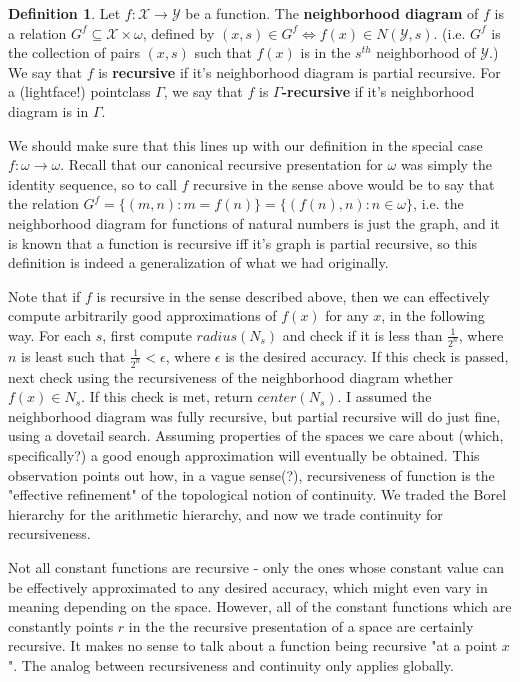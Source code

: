 \documentclass{article}
\theoremstyle{definition}
\newtheorem{definition}{Definition}[section]
\theoremstyle{plain}
\begin{document}
\begin{definition}
    Let $f:\mathcal{X} \to \mathcal{Y}$ be a function. The \textbf{neighborhood diagram} of $f$ is a relation $G^f \subseteq \mathcal{X} \times \omega$, defined by $(x,s) \in G^f \iff f(x) \in N(\mathcal{Y},s)$. (i.e. $G^f$ is the collection of pairs $(x,s)$ such that $f(x)$ is in the $s^{th}$ neighborhood of $\mathcal{Y}$.)
    We say that $f$ is \textbf{recursive} if it's neighborhood diagram is partial recursive. For a (lightface!) pointclass $\Gamma$, we say that $f$ is \textbf{$\Gamma$-recursive} if it's neighborhood diagram is in $\Gamma$. 
\end{definition}
We should make sure that this lines up with our definition in the special case $f:\omega \to \omega$. Recall that our canonical recursive presentation for $\omega$ was simply the identity sequence, so to call $f$ recursive in the sense above would be to say that the relation $G^f = \{(m,n): m = f(n)\} = \{(f(n),n): n \in \omega\}$, i.e. the neighborhood diagram for functions of natural numbers is just the graph, and it is known that a function is recursive iff it's graph is partial recursive, so this definition is indeed a generalization of what we had originally. 
\par Note that if $f$ is recursive in the sense described above, then we can effectively compute arbitrarily good approximations of $f(x)$ for any $x$, in the following way. For each $s$, first compute $radius(N_s)$ and check if it is less than $\frac{1}{2^n}$, where $n$ is least such that $\frac{1}{2^n} < \epsilon$, where $\epsilon$ is the desired accuracy. If this check is passed, next check using the recursiveness of the neighborhood diagram whether $f(x) \in N_s$. If this check is met, return $center(N_s)$. I assumed the neighborhood diagram was fully recursive, but partial recursive will do just fine, using a dovetail search. Assuming properties of the spaces we care about (which, specifically?) a good enough approximation will eventually be obtained. This observation points out how, in a vague sense(?), recursiveness of function is the "effective refinement" of the topological notion of continuity. We traded the Borel hierarchy for the arithmetic hierarchy, and now we trade continuity for recursiveness.
\par Not all constant functions are recursive - only the ones whose constant value can be effectively approximated to any desired accuracy, which might even vary in meaning depending on the space. However, all of the constant functions which are constantly points $r$ in the the recursive presentation of a space are certainly recursive. It makes no sense to talk about a function being recursive "at a point $x$". The analog between recursiveness and continuity only applies globally.
\end{document}
